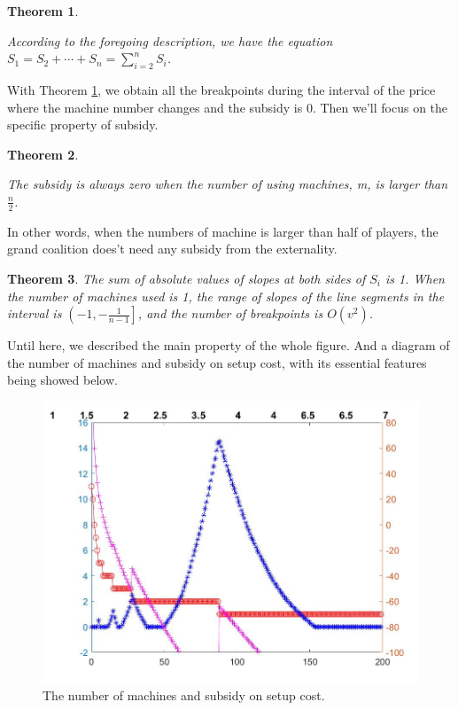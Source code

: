 \documentclass[UTF8]{article}
\newtheorem{thm}{\hspace{2em}Theorem}
\begin{document}
\begin{thm}\label{thm2}

According to the foregoing description, we have the equation $S_{1}=S_{2}+\cdots+S_{n}=\sum_{i=2}^n S_i$.

\end{thm}

With Theorem \ref{thm2}, we obtain all the breakpoints during the interval of the price where the machine number changes and the subsidy is $0$. Then we'll focus on the specific property of subsidy.

\begin{thm}\label{thm3}

The subsidy is always zero when the number of using machines, m, is larger than $\frac{n}{2}$.

\end{thm}

In other words, when the numbers of machine is larger than half of players, the grand coalition does't need any subsidy from the externality.

\begin{thm}\label{thm4}
The sum of absolute values of slopes at both sides of $S_i$ is 1.
When the number of machines used is 1, the range of slopes of the line segments in the interval is $\left( -1 , -\frac{1}{n-1} \right]$, and the number of breakpoints is $ O(v^2) $.
\end{thm}

Until here, we described the main property of the whole figure.
And a diagram of the number of machines and subsidy on setup cost, with its essential features being showed below.

\begin{figure}[h]%
	\centering  %
	\includegraphics[width=0.8\linewidth]{Figures/Image30}  %
	\caption{The number of machines and subsidy on setup cost.}  %
	\label{fig:Image11}   %
\end{figure}
\end{document}
